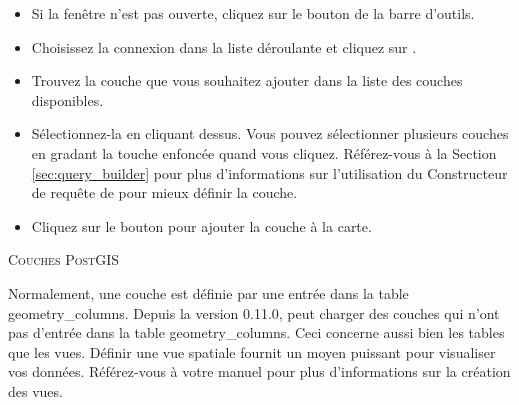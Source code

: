 \begin{itemize}[label=--]
\item Si la fenêtre  n'est pas ouverte, cliquez sur le bouton  de la barre d'outils.
\item Choisissez la connexion dans la liste déroulante et cliquez sur .
\item Trouvez la couche que vous souhaitez ajouter dans la liste des couches disponibles.
\item Sélectionnez-la en cliquant dessus. Vous pouvez sélectionner plusieurs couches en gradant la touche  enfoncée quand vous cliquez. Référez-vous à la Section \ref{sec:query_builder} pour plus d'informations sur l'utilisation du Constructeur de requête de \psq pour mieux définir la couche.
\item Cliquez sur le bouton  pour ajouter la couche à la carte.
\end{itemize}

\begin{Tip}\caption{\textsc{Couches PostGIS}}
Normalement, une couche \pg est définie par une entrée dans la table geometry\_columns. Depuis la version 0.11.0, \qg peut charger des couches qui n'ont pas d'entrée dans la table geometry\_columns. Ceci concerne aussi bien les tables que les vues. Définir une vue spatiale fournit un moyen puissant pour visualiser vos données. Référez-vous à votre manuel \psq pour plus d'informations sur la création des vues.
\end{Tip}

